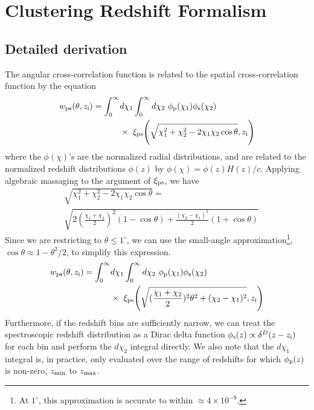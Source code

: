 \section{Clustering Redshift Formalism}\label{app:dndz}

\subsection{Detailed derivation}

The angular cross-correlation function is related to the spatial cross-correlation function by the equation
%
\begin{align}\label{first}
    {w}_{\rm ps}(\theta, z_{\rm i}) = \int_{0}^{\infty}&d\chi_1\int_{0}^{\infty}d\chi_2 \ \phi_{\rm p}(\chi_1) \phi_{\rm s}(\chi_2) \nonumber \\ 
    &\times \ \xi_{\rm ps}{\Bigg (}\sqrt{\chi_1^2 + \chi_2^2 - 2\chi_1\chi_2\cos{\theta}},z_{\rm i}{\Bigg )}
\end{align}
%
where the $\phi(\chi)$'s are the normalized radial distributions, and are related to the normalized redshift distributions $\phi(z)$ by $\phi(\chi) = \phi(z)H(z)/c$. Applying algebraic massaging to the argument of $\xi_{\rm ps}$, we have
%
\begin{align}\label{massage_R}
&\sqrt[]{\chi_1^2 + \chi_2^2 - 2\chi_1\chi_2\cos{\theta}} = \nonumber \\
&\sqrt[]{2(\frac{\chi_1 + \chi_2}{2})^2(1-\cos{\theta}) + \frac{(\chi_2 - \chi_1)^2}{2}(1+\cos{\theta})}
\end{align}
%
Since we are restricting to $\theta \leq 1^{\circ}$, we can use the small-angle approximation\footnote{At $1^{\circ}$, this approximation is accurate to within $\approx 4 \times 10^{-9}$.}, $\cos{\theta} \approx 1 - \theta^2/2$, to simplify this expression.
%
\begin{align}\label{after_smallangle}
    {w}_{\rm ps}(\theta, z_{\rm i}) = \int_{0}^{\infty}&d\chi_1\int_{0}^{\infty}d\chi_2 \ \phi_{\rm p}(\chi_1) \phi_{\rm s}(\chi_2) \nonumber \\
    &\times \ \xi_{\rm ps}{\Bigg (}\sqrt{(\frac{\chi_1 + \chi_2}{2})^2\theta^2 + (\chi_2-\chi_1)^2},z_{\rm i}{\Bigg )}
\end{align}
%
Furthermore, if the redshift bins are sufficiently narrow, we can treat the spectroscopic redshift distribution as a Dirac delta function $\phi_{\rm s}(z) \propto\delta^{D}(z - z_{\rm i})$ for each bin and perform the $d\chi_2$ integral directly. We also note that the $d\chi_1$ integral is, in practice, only evaluated over the range of redshifts for which $\phi_{\rm p}(z)$ is non-zero, $z_{\rm min}$ to $z_{\rm max}$. 
